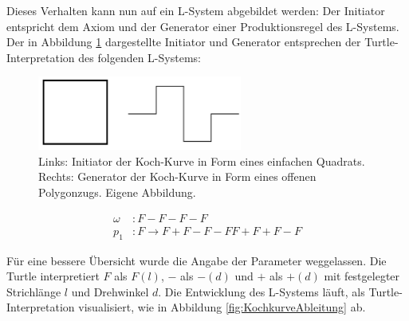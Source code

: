 Dieses Verhalten kann nun auf ein L-System abgebildet werden: Der Initiator entspricht dem Axiom und der Generator einer Produktionsregel des L-Systems. Der in Abbildung \ref{fig:InitiatorGenerator} dargestellte Initiator und Generator entsprechen der Turtle-Interpretation des folgenden L-Systems:

\begin{figure} [hbtp]
	\centering
	\includegraphics[width=0.6\textwidth]{images/InitiatorGenerator.png}
	\caption{Links: Initiator der Koch-Kurve in Form eines einfachen Quadrats. Rechts: Generator der Koch-Kurve in Form eines offenen Polygonzugs. Eigene Abbildung.}
	\label{fig:InitiatorGenerator}
\end{figure}

\begin{equation}
\begin{array}{llll}
\omega & : F-F-F-F \\
p_1 & : F \rightarrow F+F-F-FF+F+F-F
\end{array}
\label{eq:ProdKochKurve}
\end{equation} 

Für eine bessere Übersicht wurde die Angabe der Parameter weggelassen. Die Turtle interpretiert $F$ als $F(l)$, $-$ als $-(d)$ und $+$ als $+(d)$ mit festgelegter Strichlänge $l$ und Drehwinkel $d$. \label{desc:TurtleWithoutParams} Die Entwicklung des L-Systems läuft, als Turtle-Interpretation visualisiert, wie in Abbildung \ref{fig:KochkurveAbleitung} ab.

